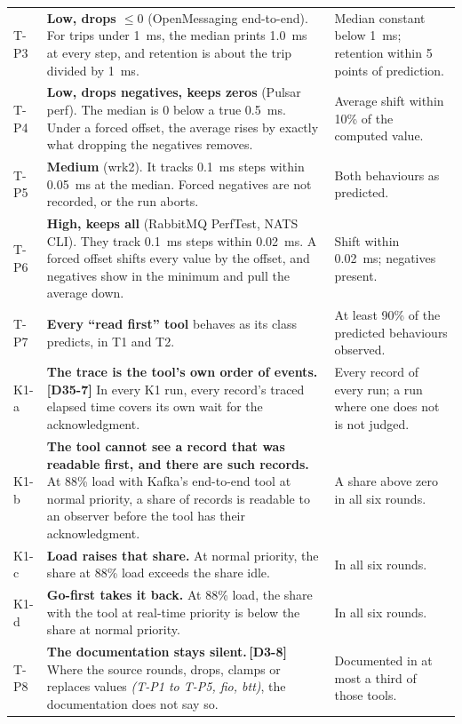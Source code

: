 \documentclass[11pt]{article}
\newcommand{\gl}[1]{{\color{soft}\itshape\small (#1)}}
\newcommand{\chgold}[1]{\,{\color{oldcol}\bfseries\footnotesize[#1]}}
\begin{document}
{\begin{longtable}{@{}p{1.0cm} p{9.5cm} p{5.6cm}@{}}
T-P3 & \textbf{Low, drops $\le 0$} (OpenMessaging end-to-end). For trips under 1~ms, the median prints 1.0~ms at every step, and retention is about the trip divided by 1~ms. & Median constant below 1~ms; retention within 5 points of prediction. \\
T-P4 & \textbf{Low, drops negatives, keeps zeros} (Pulsar perf). The median is 0 below a true 0.5~ms. Under a forced offset, the average rises by exactly what dropping the negatives removes. & Average shift within 10\% of the computed value. \\
T-P5 & \textbf{Medium} (wrk2). It tracks 0.1~ms steps within 0.05~ms at the median. Forced negatives are not recorded, or the run aborts. & Both behaviours as predicted. \\
T-P6 & \textbf{High, keeps all} (RabbitMQ PerfTest, NATS CLI). They track 0.1~ms steps within 0.02~ms. A forced offset shifts every value by the offset, and negatives show in the minimum and pull the average down. & Shift within 0.02~ms; negatives present. \\
T-P7 & \textbf{Every ``read first'' tool} behaves as its class predicts, in T1 and T2. & At least 90\% of the predicted behaviours observed. \\
K1-a & \textbf{The trace is the tool's own order of events.}\chgold{D35-7} In every K1 run, every record's traced elapsed time covers its own wait for the acknowledgment. & Every record of every run; a run where one does not is not judged. \\
K1-b & \textbf{The tool cannot see a record that was readable first, and there are such records.} At 88\% load with Kafka's end-to-end tool at normal priority, a share of records is readable to an observer before the tool has their acknowledgment. & A share above zero in all six rounds. \\
K1-c & \textbf{Load raises that share.} At normal priority, the share at 88\% load exceeds the share idle. & In all six rounds. \\
K1-d & \textbf{Go-first takes it back.} At 88\% load, the share with the tool at real-time priority is below the share at normal priority. & In all six rounds. \\
T-P8 & \textbf{The documentation stays silent.}\chgold{D3-8} Where the source rounds, drops, clamps or replaces values \gl{T-P1 to T-P5, fio, btt}, the documentation does not say so. & Documented in at most a third of those tools. \\
\bottomrule
\end{longtable}}
\end{document}
